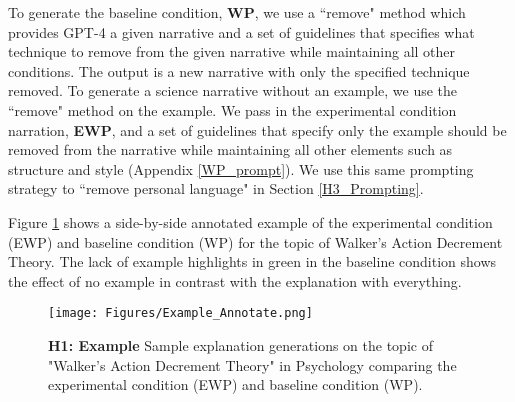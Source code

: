 To generate the baseline condition, \textbf{WP}, we use a ``remove" method which provides GPT-4 a given narrative and a set of guidelines that specifies what technique to remove from the given narrative while maintaining all other conditions. The output is a new narrative with only the specified technique removed. To generate a science narrative without an example, we use the ``remove" method on the example. We pass in the experimental condition narration, \textbf{EWP}, and a set of guidelines that specify only the example should be removed from the narrative while maintaining all other elements such as structure and style (Appendix \ref{WP_prompt}). We use this same prompting strategy to ``remove personal language" in Section \ref{H3_Prompting}.

Figure \ref{fig:example} shows a side-by-side annotated example of the experimental condition (EWP) and baseline condition (WP) for the topic of Walker's Action Decrement Theory. The lack of example highlights in green in the baseline condition shows the effect of no example in contrast with the explanation with everything.




\begin{figure}
    \centering
    \texttt{[image: Figures/Example\_Annotate.png]}
    \caption{\textbf{H1: Example} Sample explanation generations on the topic of "Walker's Action Decrement Theory" in Psychology comparing the experimental condition (EWP) and baseline condition (WP).}
    \label{fig:example}
\end{figure}




